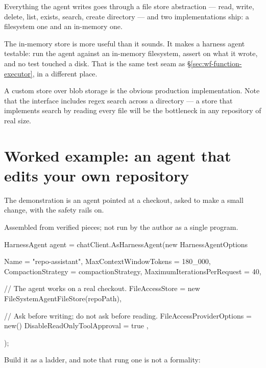 Everything the agent writes goes through a file store abstraction --- read,
write, delete, list, exists, search, create directory --- and two implementations
ship: a filesystem one and an in-memory one.

The in-memory store is more useful than it sounds. It makes a harness agent
testable: run the agent against an in-memory filesystem, assert on what it wrote,
and no test touched a disk. That is the same test seam as
\S\ref{sec:wf-function-executor}, in a different place.

A custom store over blob storage is the obvious production implementation. Note
that the interface includes regex search across a directory --- a store that
implements search by reading every file will be the bottleneck in any repository
of real size.

\section{Worked example: an agent that edits your own repository}
\label{sec:harness-example}

The demonstration is an agent pointed at a checkout, asked to make a small
change, with the safety rails on.

\begin{verifybox}
Assembled from verified pieces; not run by the author as a single program.
\end{verifybox}

\begin{csharp}[caption={A repository agent with rails on}, label={lst:harness-repo}]
HarnessAgent agent = chatClient.AsHarnessAgent(new HarnessAgentOptions
{
    Name = "repo-assistant",
    MaxContextWindowTokens = 180_000,
    CompactionStrategy = compactionStrategy,
    MaximumIterationsPerRequest = 40,

    // The agent works on a real checkout.
    FileAccessStore = new FileSystemAgentFileStore(repoPath),

    // Ask before writing; do not ask before reading.
    FileAccessProviderOptions = new() { DisableReadOnlyToolApproval = true },
});
\end{csharp}

Build it as a ladder, and note that rung one is not a formality:


